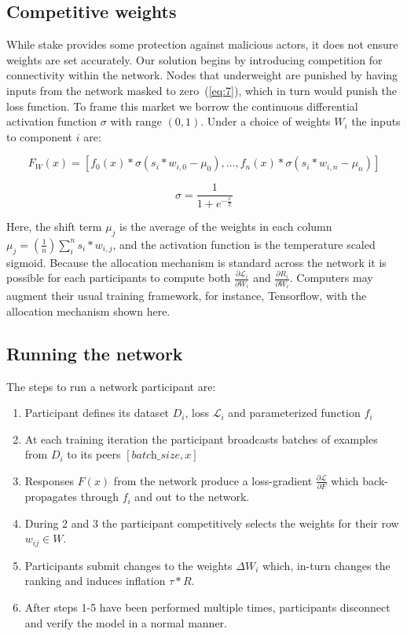 \documentclass{article}
\begin{document}
\subsection{Competitive weights}
\label{sec:competitive_weights}
While stake provides some protection against malicious actors, it does not ensure weights are set accurately. Our solution begins by introducing competition for connectivity within the network. Nodes that underweight are punished by having inputs from the network masked to zero~(\ref{eq:7}), {\color{blue} which in turn would punish the loss function}. To frame this market we borrow the continuous differential activation function $\sigma$ with range $(0,1)$. Under a choice of weights $W_i$ the inputs to component $i$ are:
\bigskip

\begin{equation}
\label{eq:7}
F_W(x) =  [f_0(x) * \sigma(s_i * w_{i,0} - \mu_0),  ... , f_n(x) * \sigma(s_i * w_{i,n} - \mu_n)]
\end{equation}

\begin{equation}
\sigma =  \frac{1}{ 1 + e^{-\frac{x}{T}} }
\end{equation}

Here, the shift term $\mu_j$ is the average of the weights in each column $\mu_j = (\frac{1}{n}) \sum_{i}^{n}{s_i * w_{i,j}}$, and the activation function is the temperature scaled sigmoid. Because the allocation mechanism is standard across the network it is possible for each participants to compute both $\frac{\partial \mathcal{L}_i}{\partial W_i}$ and $\frac{\partial R_i}{\partial W_i}$. Computers may augment their usual training framework, for instance, Tensorflow, with the allocation mechanism shown here. 
\bigskip

\subsection{Running the network}

The steps to run a network participant are:
\begin{enumerate}
	
	\item Participant defines its dataset $D_i$, loss $\mathcal{L}_i$ and parameterized function $f_i$
	\item  At each training iteration the participant broadcasts batches of examples from $D_i$ to its peers $[\textit{batch\_size}, x]$
	\item Responses $F(x)$ from the network produce a loss-gradient $\frac{\partial \mathcal{L}}{\partial F}$ which back-propagates through $f_i$ and out to the network.
	\item  During 2 and 3 the participant competitively selects the weights for their row $w_{ij} \in W$.
	\item  Participants submit changes to the weights $\Delta W_i$ which, in-turn changes the ranking and induces inflation $\tau * R$.
	\item  {\color{blue} After steps 1-5 have been performed multiple times}, participants disconnect and verify the model in a normal manner.
\end{enumerate}
\end{document}

